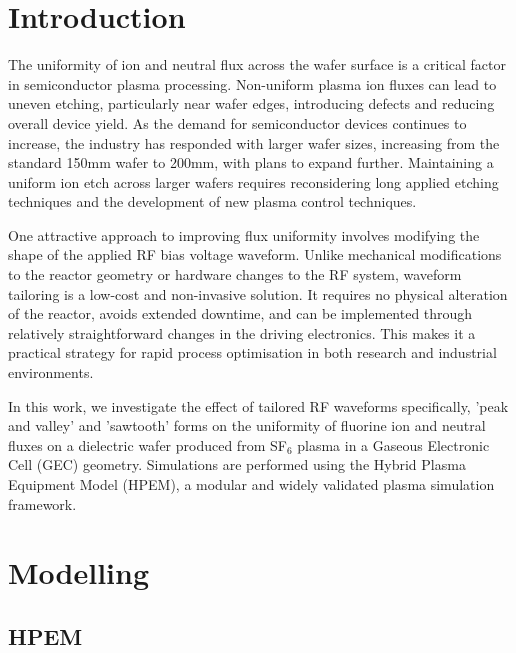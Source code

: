 \documentclass[12pt]{article}
\begin{document}
\section{Introduction}\label{Sec: Introduction}

The uniformity of ion and neutral flux across the wafer surface is a critical factor in semiconductor plasma processing. Non-uniform plasma ion fluxes can lead to uneven etching, particularly near wafer edges, introducing defects and reducing overall device yield. As the demand for semiconductor devices continues to increase, the industry has responded with larger wafer sizes, increasing from the standard 150mm wafer to 200mm, with plans to expand further. Maintaining a uniform ion etch across larger wafers requires reconsidering long applied etching techniques and the development of new plasma control techniques.

One attractive approach to improving flux uniformity involves modifying the shape of the applied RF bias voltage waveform. Unlike mechanical modifications to the reactor geometry or hardware changes to the RF system, waveform tailoring is a low-cost and non-invasive solution. It requires no physical alteration of the reactor, avoids extended downtime, and can be implemented through relatively straightforward changes in the driving electronics. This makes it a practical strategy for rapid process optimisation in both research and industrial environments.

In this work, we investigate the effect of tailored RF waveforms specifically, 'peak and valley' and 'sawtooth' forms on the uniformity of fluorine ion and neutral fluxes on a dielectric wafer produced from SF$_6$ plasma in a Gaseous Electronic Cell (GEC) geometry. Simulations are performed using the Hybrid Plasma Equipment Model (HPEM), a modular and widely validated plasma simulation framework.



\newpage
\section{Modelling}\label{Sec: Modelling}

\subsection{HPEM}
\end{document}
